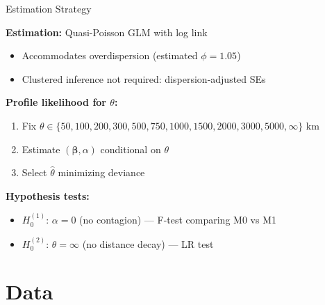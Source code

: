 \documentclass[aspectratio=169]{beamer}
\begin{document}
\begin{frame}{Estimation Strategy}

\textbf{Estimation:} Quasi-Poisson GLM with log link

\vspace{0.5em}

\begin{itemize}
    \item Accommodates overdispersion (estimated $\phi = 1.05$)
    \item Clustered inference not required: dispersion-adjusted SEs
\end{itemize}

\vspace{1em}

\textbf{Profile likelihood for $\theta$:}

\begin{enumerate}
    \item Fix $\theta \in \{50, 100, 200, 300, 500, 750, 1000, 1500, 2000, 3000, 5000, \infty\}$ km
    \item Estimate $(\boldsymbol{\beta}, \alpha)$ conditional on $\theta$
    \item Select $\hat{\theta}$ minimizing deviance
\end{enumerate}

\vspace{1em}

\textbf{Hypothesis tests:}
\begin{itemize}
    \item $H_0^{(1)}$: $\alpha = 0$ (no contagion) --- F-test comparing M0 vs M1
    \item $H_0^{(2)}$: $\theta = \infty$ (no distance decay) --- LR test
\end{itemize}

\end{frame}


\section{Data}
\end{document}
